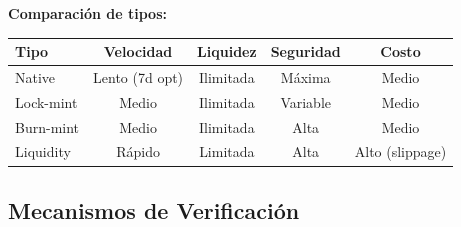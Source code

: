\documentclass[11pt,a4paper,twoside,openright]{book}
\theoremstyle{definition}
\theoremstyle{plain}
\theoremstyle{remark}
\begin{document}
\begin{mathnote}
\textbf{Comparación de tipos:}

\begin{center}
\begin{tabular}{lcccc}
\toprule
\textbf{Tipo} & \textbf{Velocidad} & \textbf{Liquidez} & \textbf{Seguridad} & \textbf{Costo} \\
\midrule
Native & Lento (7d opt) & Ilimitada & Máxima & Medio \\
Lock-mint & Medio & Ilimitada & Variable & Medio \\
Burn-mint & Medio & Ilimitada & Alta & Medio \\
Liquidity & Rápido & Limitada & Alta & Alto (slippage) \\
\bottomrule
\end{tabular}
\end{center}
\end{mathnote}

\subsection{Mecanismos de Verificación}
\end{document}
